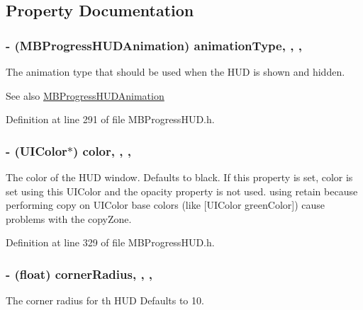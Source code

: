 \subsection{Property Documentation}
\hypertarget{interface_m_b_progress_h_u_d_a71d04bb9e2839df9377ad10d03b2e468}{
\subsubsection[{animation\+Type}]{\setlength{\rightskip}{0pt plus 5cm}-\/ ({\bf M\+B\+Progress\+H\+U\+D\+Animation}) animation\+Type\hspace{0.3cm}{\ttfamily [read]}, {\ttfamily [write]}, {\ttfamily [atomic]}, {\ttfamily [assign]}}}\label{interface_m_b_progress_h_u_d_a71d04bb9e2839df9377ad10d03b2e468}
The animation type that should be used when the H\+U\+D is shown and hidden.

\begin{DoxySeeAlso}{See also}
\hyperlink{_m_b_progress_h_u_d_8h_a892ebf586d23b21a74bc54138ca25990}{M\+B\+Progress\+H\+U\+D\+Animation} 
\end{DoxySeeAlso}


Definition at line 291 of file M\+B\+Progress\+H\+U\+D.\+h.

\hypertarget{interface_m_b_progress_h_u_d_a1f4ab0f3ddc52af9353a4cf225ad1361}{
\subsubsection[{color}]{\setlength{\rightskip}{0pt plus 5cm}-\/ (U\+I\+Color$\ast$) color\hspace{0.3cm}{\ttfamily [read]}, {\ttfamily [write]}, {\ttfamily [atomic]}, {\ttfamily [assign]}}}\label{interface_m_b_progress_h_u_d_a1f4ab0f3ddc52af9353a4cf225ad1361}
The color of the H\+U\+D window. Defaults to black. If this property is set, color is set using this U\+I\+Color and the opacity property is not used. using retain because performing copy on U\+I\+Color base colors (like \mbox{[}U\+I\+Color green\+Color\mbox{]}) cause problems with the copy\+Zone. 

Definition at line 329 of file M\+B\+Progress\+H\+U\+D.\+h.

\hypertarget{interface_m_b_progress_h_u_d_a8a3573dbf4dcdeeb187a08d0070e811c}{
\subsubsection[{corner\+Radius}]{\setlength{\rightskip}{0pt plus 5cm}-\/ (float) corner\+Radius\hspace{0.3cm}{\ttfamily [read]}, {\ttfamily [write]}, {\ttfamily [atomic]}, {\ttfamily [assign]}}}\label{interface_m_b_progress_h_u_d_a8a3573dbf4dcdeeb187a08d0070e811c}
The corner radius for th H\+U\+D Defaults to 10. 

